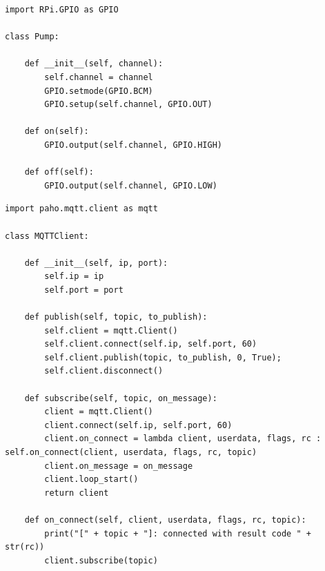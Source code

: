 \begin{lstlisting}[caption=Pump.py, label=code:pump.py]
import RPi.GPIO as GPIO

class Pump:

    def __init__(self, channel):
        self.channel = channel
        GPIO.setmode(GPIO.BCM)
        GPIO.setup(self.channel, GPIO.OUT)

    def on(self):
        GPIO.output(self.channel, GPIO.HIGH)

    def off(self):
        GPIO.output(self.channel, GPIO.LOW)
\end{lstlisting}

\begin{lstlisting}[caption=MQTTClient.py, label=code:mqtt_client.py]
import paho.mqtt.client as mqtt

class MQTTClient:

    def __init__(self, ip, port):
        self.ip = ip
        self.port = port

    def publish(self, topic, to_publish):
        self.client = mqtt.Client()
        self.client.connect(self.ip, self.port, 60)
        self.client.publish(topic, to_publish, 0, True);
        self.client.disconnect()

    def subscribe(self, topic, on_message):
        client = mqtt.Client()
        client.connect(self.ip, self.port, 60)
        client.on_connect = lambda client, userdata, flags, rc : self.on_connect(client, userdata, flags, rc, topic)
        client.on_message = on_message
        client.loop_start()
        return client

    def on_connect(self, client, userdata, flags, rc, topic):
        print("[" + topic + "]: connected with result code " + str(rc))
        client.subscribe(topic)
\end{lstlisting}

